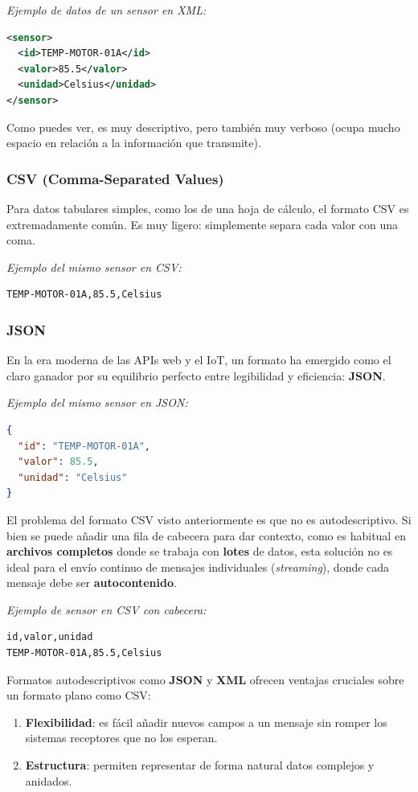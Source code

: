 \textit{Ejemplo de datos de un sensor en XML:}
\begin{lstlisting}[language=XML]
<sensor>
  <id>TEMP-MOTOR-01A</id>
  <valor>85.5</valor>
  <unidad>Celsius</unidad>
</sensor>
\end{lstlisting}

Como puedes ver, es muy descriptivo, pero también muy verboso (ocupa mucho espacio en relación a la información que transmite).

\subsubsection*{CSV (Comma-Separated Values)}
Para datos tabulares simples, como los de una hoja de cálculo, el formato CSV es extremadamente común. Es muy ligero: simplemente separa cada valor con una coma.

\textit{Ejemplo del mismo sensor en CSV:}
\begin{lstlisting}
TEMP-MOTOR-01A,85.5,Celsius
\end{lstlisting}

\subsubsection*{JSON}
En la era moderna de las APIs web y el IoT, un formato ha emergido como el claro ganador por su equilibrio perfecto entre legibilidad y eficiencia: \textbf{JSON}.

\textit{Ejemplo del mismo sensor en JSON:}
\begin{lstlisting}[language=json]
{
  "id": "TEMP-MOTOR-01A",
  "valor": 85.5,
  "unidad": "Celsius"
}
\end{lstlisting}

El problema del formato CSV visto anteriormente es que no es autodescriptivo. Si bien se puede añadir una fila de cabecera para dar contexto, como es habitual en \textbf{archivos completos} donde se trabaja con \textbf{lotes} de datos, esta solución no es ideal para el envío continuo de mensajes individuales (\textit{streaming}), donde cada mensaje debe ser \textbf{autocontenido}.

\textit{Ejemplo de sensor en CSV con cabecera:}
\begin{lstlisting}
id,valor,unidad
TEMP-MOTOR-01A,85.5,Celsius
\end{lstlisting}

Formatos autodescriptivos como \textbf{JSON} y \textbf{XML} ofrecen ventajas cruciales sobre un formato plano como CSV:
\begin{enumerate}
    \item \textbf{Flexibilidad}: es fácil añadir nuevos campos a un mensaje sin romper los sistemas receptores que no los esperan.
    \item \textbf{Estructura}: permiten representar de forma natural datos complejos y anidados.
\end{enumerate}

